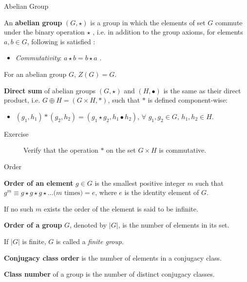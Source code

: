 \documentclass{beamer}
\newcommand\boldtext[1]{\textcolor{bolds}{\textbf{#1}}}
\newcommand\italictext[1]{\textcolor{italics}{\textit{#1}}}
\begin{document}
\begin{frame}{Abelian Group}
    \begin{definition}
        An \boldtext{abelian group} $(G,\star )$ is a group in which the elements of set $G$ commute under the binary operation $\star$ , i.e. in addition to the group axioms, for elements $a, b \in G$, following is satisfied :
        \begin{itemize}
            \item \italictext{Commutativity}: $a\star b=b\star a$ .
        \end{itemize}
    \end{definition}
    For an abelian group $G$, $Z(G) = G$.
    \begin{definition}
        \boldtext{Direct sum} of abelian groups $(G,\star)$ and $(H,\bullet)$ is the same as their direct product, i.e. $G\oplus H=(G\times H,\ast)$, such that $\ast$ is defined component-wise:
        \begin{itemize}
            \item $(g_1,h_1)\ast(g_2,h_2)=(g_1\star g_2,h_1\bullet h_2)$, $\forall$ $g_1,g_2\in G$, $h_1,h_2\in H$.
        \end{itemize}
    \end{definition}
    \begin{description}
        \item[Exercise] Verify that the operation $\ast$ on the set $G\times H$ is commutative. 
    \end{description}
\end{frame}

\begin{frame}{Order}
    \begin{definition}
        \boldtext{Order of an element} $g\in G$ is the smallest positive integer $m$ such that $g^m\equiv g\star g\star g\star\dots\text{($m$ times)}=e$, where $e$ is the identity element of $G$. 
    \end{definition}
    If no such $m$ exists the order of the element is said to be infinite.
    \begin{definition}
        \boldtext{Order of a group} $G$, denoted by $\lvert G\rvert$, is the number of elements in its set.
    \end{definition}
    If $\lvert G\rvert$ is finite, $G$ is called a \italictext{finite group}.
    \begin{definition}
        \boldtext{Conjugacy class order} is the number of elements in a conjugacy class.
    \end{definition}
    \begin{definition}
        \boldtext{Class number} of a group is the number of distinct conjugacy classes.
    \end{definition}
\end{frame}
\end{document}
